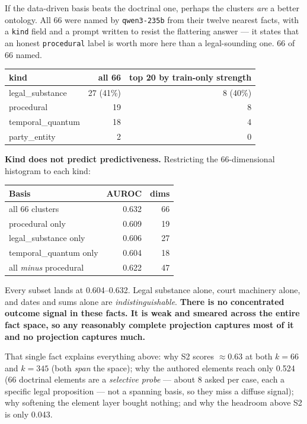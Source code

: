 \documentclass[12pt,a4paper]{article}
\newcommand{\code}[1]{\texttt{\small #1}}
\begin{document}
If the data-driven basis beats the doctrinal one, perhaps the clusters \emph{are} a better ontology.
All 66 were named by \code{qwen3-235b} from their twelve nearest facts, with a \code{kind} field and
a prompt written to resist the flattering answer --- it states that an honest \code{procedural} label
is worth more here than a legal-sounding one. 66 of 66 named.

\begin{center}
\begin{tabular}{@{}lrr@{}}
\toprule
\textbf{kind} & \textbf{all 66} & \textbf{top 20 by train-only strength} \\
\midrule
legal\_substance & 27 (41\%) & 8 (40\%) \\
procedural & 19 & 8 \\
temporal\_quantum & 18 & 4 \\
party\_entity & 2 & 0 \\
\bottomrule
\end{tabular}
\end{center}

\textbf{Kind does not predict predictiveness.} Restricting the 66-dimensional histogram to each kind:

\begin{center}
\begin{tabular}{@{}lrr@{}}
\toprule
\textbf{Basis} & \textbf{AUROC} & \textbf{dims} \\
\midrule
all 66 clusters & 0.632 & 66 \\
procedural only & 0.609 & 19 \\
legal\_substance only & 0.606 & 27 \\
temporal\_quantum only & 0.604 & 18 \\
all \emph{minus} procedural & 0.622 & 47 \\
\bottomrule
\end{tabular}
\end{center}

\begin{tcolorbox}[plainbox,title={The finding that explains the whole sequence}]
Every subset lands at 0.604--0.632. Legal substance alone, court machinery alone, and dates and sums
alone are \emph{indistinguishable}. \textbf{There is no concentrated outcome signal in these facts.
It is weak and smeared across the entire fact space, so any reasonably complete projection captures
most of it and no projection captures much.}
\end{tcolorbox}

That single fact explains everything above: why S2 scores $\approx 0.63$ at both $k=66$ and $k=345$
(both \emph{span} the space); why the authored elements reach only 0.524 (66 doctrinal elements are a
\emph{selective probe} --- about 8 asked per case, each a specific legal proposition --- not a
spanning basis, so they miss a diffuse signal); why softening the element layer bought nothing; and
why the headroom above S2 is only 0.043.
\end{document}
